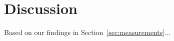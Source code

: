 \section{Discussion} \label{sec:discussion}
Based on our findings in Section~\ref{sec:measurements}...
